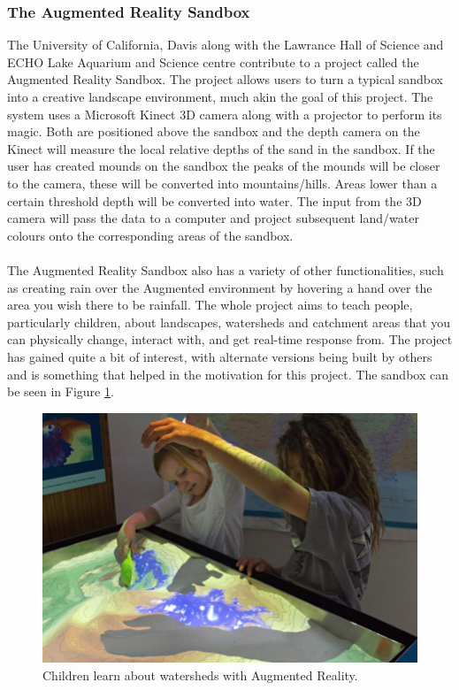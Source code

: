 \documentclass[11pt]{article}
\begin{document}
\subsubsection{The Augmented Reality Sandbox}
The University of California, Davis along with the Lawrance Hall of Science 
and ECHO Lake Aquarium and Science centre contribute to a project called the
Augmented Reality Sandbox\cite{Reed14}. The project allows users to turn a 
typical sandbox
into a creative landscape environment, much akin the goal of this project.
The system uses a Microsoft Kinect 3D camera along with a projector to 
perform its magic. Both are positioned above the sandbox and the depth 
camera on the Kinect
will measure the local relative depths of the sand in the sandbox. If the
user has created mounds on the sandbox the peaks of the mounds
will be closer to the camera, these will be converted into mountains/hills. 
Areas lower than a certain threshold 
depth will be converted into water. The input from the 3D camera will pass 
the data to a computer and project subsequent land/water colours onto the
corresponding areas of the sandbox.\\
\\
The Augmented Reality Sandbox also has a variety of other functionalities, such
as creating rain over the Augmented environment by hovering a hand over the 
area you wish there to be rainfall. The whole project aims to teach people, 
particularly children, about landscapes, watersheds and catchment areas 
that you can physically change, interact with, and get real-time response 
from. The project has gained quite a bit of interest, with alternate 
versions being built by others and is something that helped in the 
motivation for this project. The sandbox can be seen in Figure \ref{arsandbox}. \\

\begin{figure}[!h]
	\centering
	\includegraphics[scale=0.8]{pics/sandbox.jpg}
	\caption{Children learn about watersheds with Augmented Reality.}
	\label{arsandbox}
\end{figure}
\end{document}
